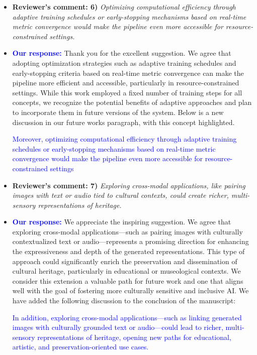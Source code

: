 \documentclass[11pt]{article}
\begin{document}
\begin{itemize}
\item {\bf Reviewer's comment: 6)} {\it
Optimizing computational efficiency through adaptive training schedules or early-stopping mechanisms based on real-time metric convergence would make the pipeline even more accessible for resource-constrained settings.}

\item {\bf \textcolor{blue}{Our response:}} Thank you for the excellent suggestion. We agree that adopting optimization strategies such as adaptive training schedules and early-stopping criteria based on real-time metric convergence can make the pipeline more efficient and accessible, particularly in resource-constrained settings. While this work employed a fixed number of training steps for all concepts, we recognize the potential benefits of adaptive approaches and plan to incorporate them in future versions of the system. Below is a new discussion in our future works paragraph, with this concept highlighted.

\textcolor{blue}{Moreover, optimizing computational efficiency through adaptive training schedules or early-stopping mechanisms based on real-time metric convergence would make the pipeline even more accessible for resource-constrained settings}


\item {\bf Reviewer's comment: 7)} {\it
Exploring cross-modal applications, like pairing images with text or audio tied to cultural contexts, could create
richer, multi-sensory representations of heritage. }

\item {\bf \textcolor{blue}{Our response:}} We appreciate the inspiring suggestion. We agree that exploring cross-modal applications—such as pairing images with culturally contextualized text or audio—represents a promising direction for enhancing the expressiveness and depth of the generated representations. This type of approach could significantly enrich the preservation and dissemination of cultural heritage, particularly in educational or museological contexts. We consider this extension a valuable path for future work and one that aligns well with the goal of fostering more culturally sensitive and inclusive AI. We have added the following discussion to the conclusion of the manuscript:

\textcolor{blue}{In addition, exploring cross-modal applications—such as linking generated images with culturally grounded text or audio—could lead to richer, multi-sensory representations of heritage, opening new paths for educational, artistic, and preservation-oriented use cases.}



\end{itemize}
\end{document}
